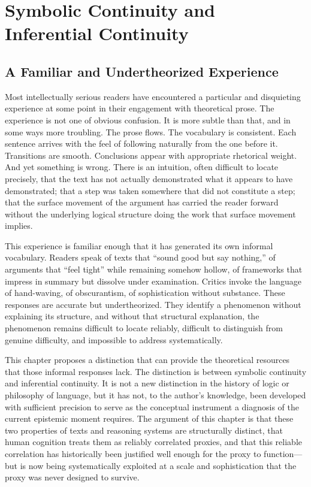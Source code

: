 \documentclass[12pt, openright, twoside]{book}
\begin{document}
\chapter{Symbolic Continuity and Inferential Continuity}

\section{A Familiar and Undertheorized Experience}

Most intellectually serious readers have encountered a particular and disquieting
experience at some point in their engagement with theoretical prose. The experience
is not one of obvious confusion. It is more subtle than that, and in some ways more
troubling. The prose flows. The vocabulary is consistent. Each sentence arrives with
the feel of following naturally from the one before it. Transitions are smooth.
Conclusions appear with appropriate rhetorical weight. And yet something is wrong.
There is an intuition, often difficult to locate precisely, that the text has
not actually demonstrated what it appears to have demonstrated; that a step was
taken somewhere that did not constitute a step; that the surface movement of the
argument has carried the reader forward without the underlying logical structure
doing the work that surface movement implies.

This experience is familiar enough that it has generated its own informal vocabulary.
Readers speak of texts that ``sound good but say nothing,'' of arguments that
``feel tight'' while remaining somehow hollow, of frameworks that impress in
summary but dissolve under examination. Critics invoke the language of hand-waving,
of obscurantism, of sophistication without substance. These responses are accurate
but undertheorized. They identify a phenomenon without explaining its structure,
and without that structural explanation, the phenomenon remains difficult to locate
reliably, difficult to distinguish from genuine difficulty, and impossible to
address systematically.

This chapter proposes a distinction that can provide the theoretical resources
that those informal responses lack. The distinction is between symbolic continuity
and inferential continuity. It is not a new distinction in the history of logic
or philosophy of language, but it has not, to the author's knowledge, been developed
with sufficient precision to serve as the conceptual instrument a diagnosis of
the current epistemic moment requires. The argument of this chapter is that these
two properties of texts and reasoning systems are structurally distinct, that human
cognition treats them as reliably correlated proxies, and that this reliable
correlation has historically been justified well enough for the proxy to function---
but is now being systematically exploited at a scale and sophistication that the
proxy was never designed to survive.
\end{document}
